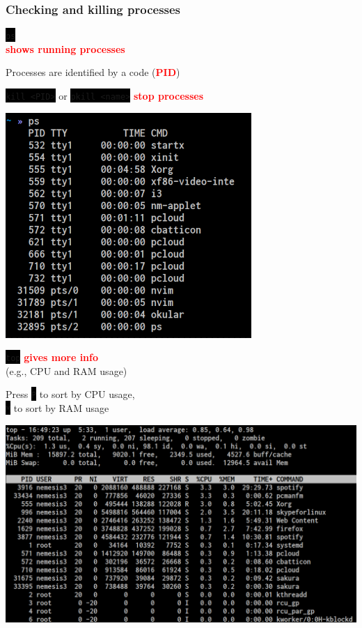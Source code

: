 \documentclass[unknownkeysallowed, 10pt, a4 paper, handout]{beamer}
\newcommand{\focus}[1]{\textbf{\textcolor{red}{#1}}}
\newcommand{\code}[1]{\colorbox{black}{\color{green}\texttt{#1}}}
\newcommand{\sidebyside}[5]{
  \begin{minipage}{#1\textwidth}
    #2
  \end{minipage} #3 \begin{minipage}{#4\textwidth}
    #5
  \end{minipage}
}
\begin{document}
\begin{frame}
  \begin{center}
    \frametitle{Checking and killing processes}

    \sidebyside{0.47}{
      \centering
      \code{ps}\\
      \focus{shows running processes}

      \vspace{4mm}

      Processes are identified by a code (\focus{PID})

      \vspace{4mm}

      \code{kill <PID>} or \code{pkill <name>} \focus{stop processes}
    }{\hfill}{0.50}{
      \begin{center}
        \includegraphics[width=0.70\textwidth]{pics/ps.png}
      \end{center}
    }

    \vspace{4mm}

    \sidebyside{0.44}{
      \centering
      \code{top} \focus{gives more info}\\
      (e.g., CPU and RAM usage)

      \vspace{3mm}

      Press \code{P} to sort by CPU usage,\\
      \code{M} to sort by RAM usage
    }{\hfill}{0.54}{
      \begin{center}
        \includegraphics[width=1.00\textwidth]{pics/top.png}
      \end{center}
    }
  \end{center}
\end{frame}
\end{document}
